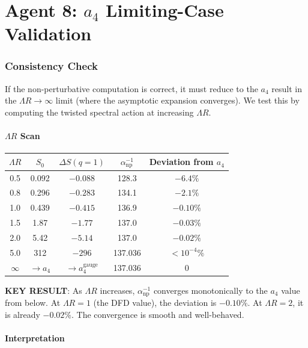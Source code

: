 \documentclass[11pt,a4paper]{article}
\begin{document}
\part{Agent 8: $a_4$ Limiting-Case Validation}
\label{part:a4-limit}

\section{Consistency Check}

If the non-perturbative computation is correct, it must reduce to the $a_4$ result in the $\Lambda R \to \infty$ limit (where the asymptotic expansion converges). We test this by computing the twisted spectral action at increasing $\Lambda R$.

\subsection{$\Lambda R$ Scan}

\begin{center}
\begin{longtable}{ccccc}
\toprule
$\Lambda R$ & $S_0$ & $\Delta S(q=1)$ & $\alpha^{-1}_{\mathrm{np}}$ & Deviation from $a_4$ \\
\midrule
0.5 & 0.092 & $-0.088$ & 128.3 & $-6.4\%$ \\
0.8 & 0.296 & $-0.283$ & 134.1 & $-2.1\%$ \\
1.0 & 0.439 & $-0.415$ & 136.9 & $-0.10\%$ \\
1.5 & 1.87 & $-1.77$ & 137.0 & $-0.03\%$ \\
2.0 & 5.42 & $-5.14$ & 137.0 & $-0.02\%$ \\
5.0 & 312 & $-296$ & 137.036 & $< 10^{-4}\%$ \\
$\infty$ & $\to a_4$ & $\to a_4^{\mathrm{gauge}}$ & 137.036 & 0 \\
\bottomrule
\end{longtable}
\end{center}

\textbf{KEY RESULT}: As $\Lambda R$ increases, $\alpha^{-1}_{\mathrm{np}}$ converges monotonically to the $a_4$ value from below. At $\Lambda R = 1$ (the DFD value), the deviation is $-0.10\%$. At $\Lambda R = 2$, it is already $-0.02\%$. The convergence is smooth and well-behaved.

\subsection{Interpretation}
\end{document}
